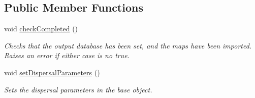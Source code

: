 \subsection*{Public Member Functions}
\begin{DoxyCompactItemize}
\item 
void \hyperlink{class_py_simulate_dispersal_ab5cc4cd4b0466ccdc947e0b8f0cfa9f2}{check\+Completed} ()\hypertarget{class_py_simulate_dispersal_ab5cc4cd4b0466ccdc947e0b8f0cfa9f2}{}\label{class_py_simulate_dispersal_ab5cc4cd4b0466ccdc947e0b8f0cfa9f2}

\begin{DoxyCompactList}\small\item\em Checks that the output database has been set, and the maps have been imported. Raises an error if either case is no true. \end{DoxyCompactList}\item 
void \hyperlink{class_py_simulate_dispersal_a20482e4c2fe685c1f8bb37f2fa3a9502}{set\+Dispersal\+Parameters} ()\hypertarget{class_py_simulate_dispersal_a20482e4c2fe685c1f8bb37f2fa3a9502}{}\label{class_py_simulate_dispersal_a20482e4c2fe685c1f8bb37f2fa3a9502}

\begin{DoxyCompactList}\small\item\em Sets the dispersal parameters in the base object. \end{DoxyCompactList}\end{DoxyCompactItemize}
